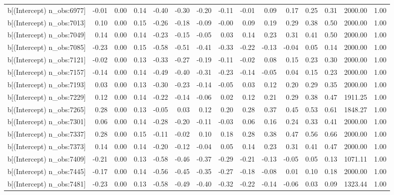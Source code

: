 \begin{table}[ht]
\begin{tabular}{rrrrrrrrrrrrrrr}
  b[(Intercept) n\_obs:6977] & -0.01 & 0.00 & 0.14 & -0.40 & -0.30 & -0.20 & -0.11 & -0.01 & 0.09 & 0.17 & 0.25 & 0.31 & 2000.00 & 1.00 \\ 
  b[(Intercept) n\_obs:7013] & 0.10 & 0.00 & 0.15 & -0.26 & -0.18 & -0.09 & -0.00 & 0.09 & 0.19 & 0.29 & 0.38 & 0.50 & 2000.00 & 1.00 \\ 
  b[(Intercept) n\_obs:7049] & 0.14 & 0.00 & 0.14 & -0.23 & -0.15 & -0.05 & 0.03 & 0.14 & 0.23 & 0.31 & 0.41 & 0.50 & 2000.00 & 1.00 \\ 
  b[(Intercept) n\_obs:7085] & -0.23 & 0.00 & 0.15 & -0.58 & -0.51 & -0.41 & -0.33 & -0.22 & -0.13 & -0.04 & 0.05 & 0.14 & 2000.00 & 1.00 \\ 
  b[(Intercept) n\_obs:7121] & -0.02 & 0.00 & 0.13 & -0.33 & -0.27 & -0.19 & -0.11 & -0.02 & 0.08 & 0.15 & 0.23 & 0.30 & 2000.00 & 1.00 \\ 
  b[(Intercept) n\_obs:7157] & -0.14 & 0.00 & 0.14 & -0.49 & -0.40 & -0.31 & -0.23 & -0.14 & -0.05 & 0.04 & 0.15 & 0.23 & 2000.00 & 1.00 \\ 
  b[(Intercept) n\_obs:7193] & 0.03 & 0.00 & 0.13 & -0.30 & -0.23 & -0.14 & -0.05 & 0.03 & 0.12 & 0.20 & 0.29 & 0.35 & 2000.00 & 1.00 \\ 
  b[(Intercept) n\_obs:7229] & 0.12 & 0.00 & 0.14 & -0.22 & -0.14 & -0.06 & 0.02 & 0.12 & 0.21 & 0.29 & 0.38 & 0.47 & 1911.25 & 1.00 \\ 
  b[(Intercept) n\_obs:7265] & 0.28 & 0.00 & 0.13 & -0.05 & 0.03 & 0.12 & 0.20 & 0.28 & 0.37 & 0.45 & 0.53 & 0.61 & 1848.27 & 1.00 \\ 
  b[(Intercept) n\_obs:7301] & 0.06 & 0.00 & 0.14 & -0.28 & -0.20 & -0.11 & -0.03 & 0.06 & 0.16 & 0.24 & 0.33 & 0.41 & 2000.00 & 1.00 \\ 
  b[(Intercept) n\_obs:7337] & 0.28 & 0.00 & 0.15 & -0.11 & -0.02 & 0.10 & 0.18 & 0.28 & 0.38 & 0.47 & 0.56 & 0.66 & 2000.00 & 1.00 \\ 
  b[(Intercept) n\_obs:7373] & 0.14 & 0.00 & 0.14 & -0.20 & -0.12 & -0.04 & 0.05 & 0.14 & 0.23 & 0.31 & 0.41 & 0.47 & 2000.00 & 1.00 \\ 
  b[(Intercept) n\_obs:7409] & -0.21 & 0.00 & 0.13 & -0.58 & -0.46 & -0.37 & -0.29 & -0.21 & -0.13 & -0.05 & 0.05 & 0.13 & 1071.11 & 1.00 \\ 
  b[(Intercept) n\_obs:7445] & -0.17 & 0.00 & 0.14 & -0.56 & -0.45 & -0.35 & -0.27 & -0.18 & -0.08 & 0.01 & 0.10 & 0.18 & 2000.00 & 1.00 \\ 
  b[(Intercept) n\_obs:7481] & -0.23 & 0.00 & 0.13 & -0.58 & -0.49 & -0.40 & -0.32 & -0.22 & -0.14 & -0.06 & 0.03 & 0.09 & 1323.44 & 1.00 \\ 

\end{tabular}
\end{table}
